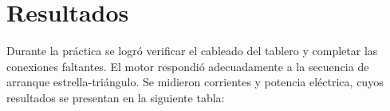 \section{Resultados}
Durante la práctica se logró verificar el cableado del tablero y completar las conexiones faltantes. 
El motor respondió adecuadamente a la secuencia de arranque estrella-triángulo. 
Se midieron corrientes y potencia eléctrica, cuyos resultados se presentan en la siguiente tabla:

